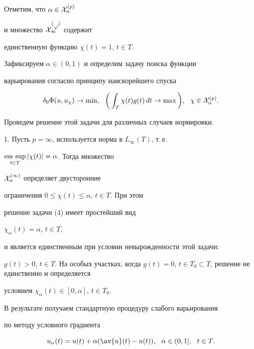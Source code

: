 Отметим, что $\alpha \in {\cal X}_{\alpha}^{(p)}$ 


и множество $\cal X_{1}^{(p)}$ содержит


единственную функцию $\chi(t) = 1$, $t \in T.$





Зафиксируем $\alpha \in (0, 1)$ и определим задачу поиска функции


варьирования согласно принципу наискорейшего спуска


\begin{equation}


\delta_{0} \Phi(u, u_{\chi}) \rightarrow \min,\ \ 


\bigg(\int_{T} \chi(t)g(t)\,dt \rightarrow \max\bigg),


\ \ \chi \in {\cal X}_{\alpha}^{(p)}.


\end{equation}





Проведем решение этой задачи для различных случаев нормировки.





1. Пусть $p = \infty$, используется норма в $L_{\infty}(T)$, т.\,е. 


$\esssup\limits_{t \in T} |\chi(t)| = \alpha$. Тогда множество


${\cal X}_{\alpha}^{(\infty)}$ определяет двусторонние


ограничения $0 \leq \chi(t) \leq \alpha$, $t \in T$. При этом


решение задачи (4) имеет простейший вид


$\chi_{\alpha}(t) = \alpha$, $t \in T$,


и является единственным при условии невырожденности этой задачи:


$g(t) > 0$, $t \in T$. На особых участках, когда $g(t) =


0$, $t \in T_{0} \subset T$, решение не единственно и определяется


условием $\chi_{\alpha}(t) \in [0, \alpha]$, $t \in T_{0}$.





В результате получаем стандартную процедуру слабого варьирования


по методу условного градиента


\begin{equation}


u_{\alpha}(t) = u(t) + \alpha (\ov{u}(t) - u(t)),


\ \ \alpha \in (0, 1],\ \ t \in T.


\end{equation}


